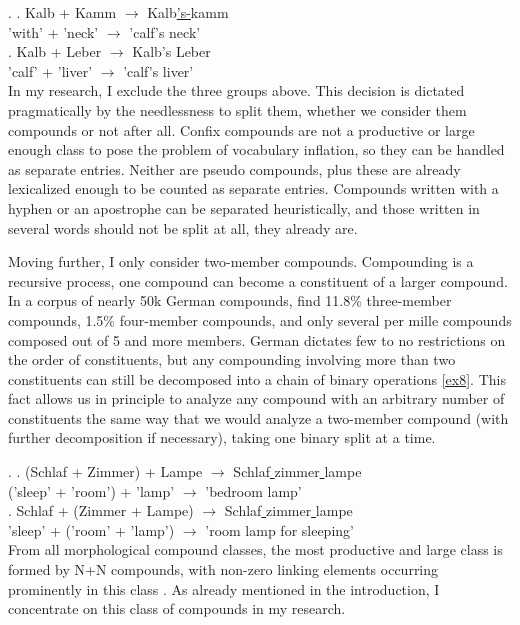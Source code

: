 \documentclass[11pt]{article}
\begin{document}
\ex.
\ag. \label{ex7:1}Kalb + Kamm {$\rightarrow$} Kalb\underline{'s-}kamm \\
'with' + 'neck' {$\rightarrow$} {'calf's neck'} \\
\bg. \label{ex7:2}Kalb + Leber {$\rightarrow$} {Kalb's Leber} \\
'calf' + 'liver' {$\rightarrow$} {'calf's liver'} \\


In my research, I exclude the three groups above. This decision is dictated pragmatically by the needlessness to split them, whether we consider them compounds or not after all. Confix compounds are not a productive or large enough class to pose the problem of vocabulary inflation, so they can be handled as separate entries. Neither are pseudo compounds, plus these are already lexicalized enough to be counted as separate entries. Compounds written with a hyphen or an apostrophe can be separated heuristically, and those written in several words should not be split at all, they already are.

Moving further, I only consider two-member compounds. Compounding is a recursive process, one compound can become a constituent of a larger compound. In a corpus of nearly 50k German compounds, \citet[13-30]{OrtnerMullerBollhagen+1991} find 11.8\% three-member compounds, 1.5\% four-member compounds, and only several per mille compounds composed out of 5 and more members. German dictates few to no restrictions on the order of constituents, but any compounding involving more than two constituents can still be decomposed into a chain of binary operations \ref{ex8}. This fact allows us in principle to analyze any compound with an arbitrary number of constituents the same way that we would analyze a two-member compound (with further decomposition if necessary), taking one binary split at a time.

\ex. \label{ex8}
\ag. (Schlaf + Zimmer) + Lampe {$\rightarrow$} Schlaf\underline{ }zimmer\underline{ }lampe \\
('sleep' + 'room') + 'lamp' {$\rightarrow$} {'bedroom lamp'} \\
\bg. Schlaf + (Zimmer + Lampe) {$\rightarrow$} Schlaf\underline{ }zimmer\underline{ }lampe \\
'sleep' + ('room' + 'lamp') {$\rightarrow$} {'room lamp for sleeping'} \\


From all morphological compound classes, the most productive and large class is formed by N+N compounds, with non-zero linking elements occurring prominently in this class \cite{Schlucker2022}. As already mentioned in the introduction, I concentrate on this class of compounds in my research.
\end{document}
